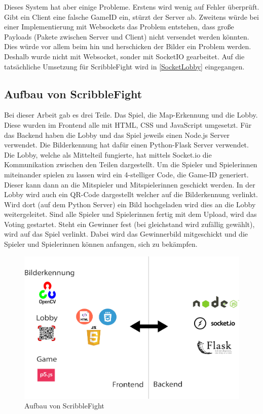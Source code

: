 Dieses System hat aber einige Probleme. Erstens wird wenig auf Fehler überprüft.
Gibt ein Client eine falsche GameID ein, stürzt der Server ab. Zweitens würde bei einer Implementierung mit
Websockets das Problem entstehen, dass große Payloads (Pakete zwischen Server und Client) nicht versendet werden könnten.
Dies würde vor allem beim hin und herschicken der Bilder ein Problem werden. Deshalb wurde
nicht mit Websocket, sonder mit SocketIO gearbeitet. Auf die tatsächliche Umsetzung für ScribbleFight wird in
\ref{SocketLobby} eingegangen.

\subsection{Aufbau von ScribbleFight}
Bei dieser Arbeit gab es drei Teile. Das Spiel, die Map-Erkennung und die Lobby. Diese wurden im Frontend alle mit HTML, CSS und JavaScript umgesetzt.
Für das Backend haben die Lobby und das Spiel jeweils einen Node.js Server verwendet. Die Bilderkennung hat dafür einen Python-Flask Server verwendet. Die Lobby, welche als Mittelteil fungierte, hat mittels Socket.io die Kommunikation zwischen den Teilen dargestellt.
Um die Spieler und Spielerinnen miteinander spielen zu lassen wird ein 4-stelliger Code, die Game-ID generiert. Dieser kann dann an die Mitspieler und Mitspielerinnen geschickt werden. In der Lobby wird auch ein QR-Code dargestellt welcher auf die Bilderkennung verlinkt.
Wird dort (auf dem Python Server) ein Bild hochgeladen wird dies an die Lobby weitergeleitet. Sind alle Spieler und Spielerinnen fertig mit dem Upload, wird das Voting gestartet. Steht ein Gewinner fest (bei gleichstand wird zufällig gewählt), wird auf das Spiel verlinkt. Dabei wird das Gewinnerbild mitgeschickt und die Spieler und Spielerinnen können anfangen, sich zu bekämpfen.
\begin{figure}[H]
    \centering
    \includegraphics[scale=0.3]{pics/architektur.png}
    \caption{Aufbau von ScribbleFight}
\end{figure}

